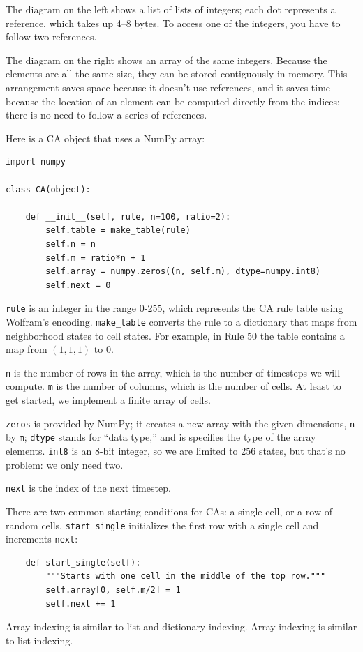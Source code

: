 \documentclass[10pt]{book}
\begin{document}
The diagram on the left shows a list of lists of integers; each
dot represents a reference, which takes up 4--8 bytes.  To access
one of the integers, you have to follow two references.

The diagram on the right shows an array of the same integers.  Because
the elements are all the same size, they can be stored contiguously in
memory.  This arrangement saves space because it doesn't use
references, and it saves time because the location of an element can
be computed directly from the indices; there is no need to follow a
series of references.

Here is a CA object that uses a NumPy array:

\begin{verbatim}
import numpy

class CA(object):

    def __init__(self, rule, n=100, ratio=2):
        self.table = make_table(rule)
        self.n = n
        self.m = ratio*n + 1
        self.array = numpy.zeros((n, self.m), dtype=numpy.int8)
        self.next = 0
\end{verbatim}

{\tt rule} is an integer in the range 0-255, which represents the
CA rule table using Wolfram's encoding.  \verb"make_table" converts
the rule to a dictionary that maps from neighborhood states to cell
states.  For example, in Rule 50 the table contains a map from
$(1,1,1)$ to 0.

{\tt n} is the number of rows in the array, which is the number
of timesteps we will compute.  {\tt m} is the number of columns,
which is the number of cells.  At least to get started, we implement
a finite array of cells.

{\tt zeros} is provided by NumPy; it creates a new array with
the given dimensions, {\tt n} by {\tt m}; {\tt dtype} stands
for ``data type,'' and is specifies the type of the array elements.
{\tt int8} is an 8-bit integer, so we are limited to 256 states,
but that's no problem: we only need two.

{\tt next} is the index of the next timestep.

There are two common starting conditions for CAs: a single cell, or a row
of random cells.  \verb"start_single" initializes the first row with
a single cell and increments {\tt next}:

\begin{verbatim}
    def start_single(self):
        """Starts with one cell in the middle of the top row."""
        self.array[0, self.m/2] = 1
        self.next += 1
\end{verbatim}
%
Array indexing is similar to list and dictionary indexing.
Array indexing is similar to list indexing.
\end{document}

